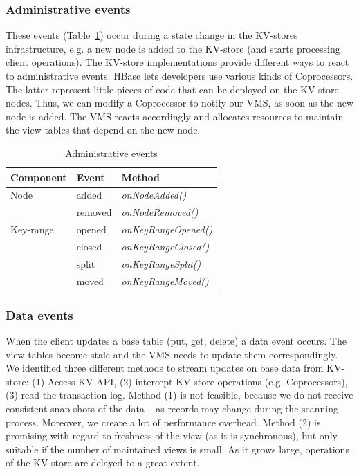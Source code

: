 \subsubsection{Administrative events}

These events (Table~\ref{tab:kvs_a_events}) occur during a state change in the KV-stores 
infrastructure, e.g. a new node is added to the KV-store (and starts 
processing client operations).  The KV-store 
implementations provide different ways to react to administrative 
events. HBase lets developers use various kinds of Coprocessors. The 
latter represent little pieces of code that can be deployed on the 
KV-store nodes. Thus, we can modify a Coprocessor to notify our VMS, as 
soon as the new node is added. The VMS reacts accordingly and allocates 
resources to maintain the view tables that depend on the new node. 



\begin{table}
\setlength{\belowrulesep}{0pt}
\setlength{\aboverulesep}{0pt}
\setlength\extrarowheight{2pt}
\begin{center}
\begin{tabular}{l l l}
\toprule
Component & Event & Method \\
\midrule
Node & added & \textit{onNodeAdded()}  \\
 & removed & \textit{onNodeRemoved()}    \\
Key-range & opened   & \textit{onKeyRangeOpened()}\\
 & closed & \textit{onKeyRangeClosed()} \\
 & split & \textit{onKeyRangeSplit()} \\
  & moved & \textit{onKeyRangeMoved()} \\
\bottomrule 
\end{tabular}
\caption{Administrative events}
\label{tab:kvs_a_events}
\end{center}
\end{table}

\subsubsection{Data events}


When the client updates a base table (put, get, delete) a data event
occurs. The view tables become stale and the VMS needs to update them
correspondingly. We identified three different methods to stream updates
on base data from KV-store: (1) Access KV-API, 
(2) intercept KV-store operations (e.g. Coprocessors), (3) read the 
transaction log. Method (1) is not feasible, because we do not receive 
consistent snap-shots of the data -- as records may change during the 
scanning process. Moreover, we create a lot of performance overhead. 
Method (2) is promising with regard to freshness of the view (as it is 
synchronous), but only suitable if the number of maintained views is 
small. As it grows large, operations of the KV-store are delayed to a 
great extent.
 
